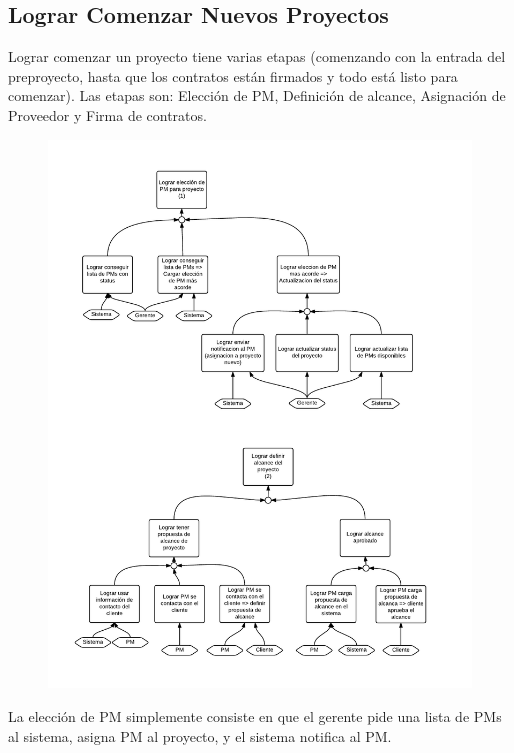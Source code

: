 \newpage
\subsection{Lograr Comenzar Nuevos Proyectos}

Lograr comenzar un proyecto tiene varias etapas (comenzando con la entrada del preproyecto, hasta que los contratos están firmados y todo está listo para comenzar).
Las etapas son: Elección de PM, Definición de alcance, Asignación de Proveedor y Firma de contratos.

\begin{figure}[H]
\includegraphics[width=\textwidth, clip=true, trim=15pt 30pt 15pt 40pt]{imagenes/objetivos/objetivos11.pdf}
\end{figure}

La elección de PM simplemente consiste en que el gerente pide una lista de PMs al sistema, asigna PM al proyecto, y el sistema notifica al PM.

